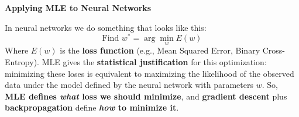 \highspace
\begin{flushleft}
    \textcolor{Green3}{ \textbf{Applying MLE to Neural Networks}}
\end{flushleft}
In neural networks we do something that looks like this:
\begin{equation*}
    \text{Find } w^{*} = \arg\min_{w} E\left(w\right)
\end{equation*}
Where $E(w)$ is the \textbf{loss function} (e.g., Mean Squared Error, Binary Cross-Entropy). MLE gives the \textbf{statistical justification} for this optimization: minimizing these loses is equivalent to maximizing the likelihood of the observed data under the model defined by the neural network with parameters $w$. So, \textbf{MLE defines \emph{what} loss we should minimize}, and \textbf{gradient descent} plus \textbf{backpropagation} define \textbf{\emph{how} to minimize it}.
